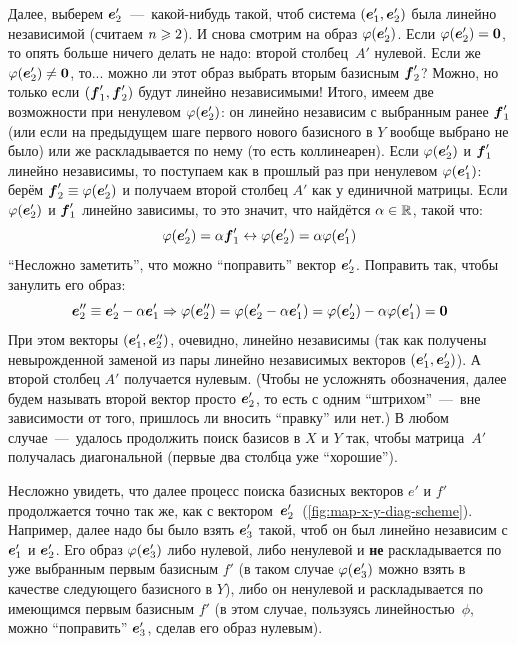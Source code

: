 \documentclass[a4paper,12pt]{article}
\begin{document}
  Далее, выберем $\boldsymbol e_2'$~---~какой-нибудь такой, чтоб система $(\boldsymbol e_1', \boldsymbol e_2')$ была линейно независимой (считаем $n \hm\geq 2$).
  И снова смотрим на образ $\varphi(\boldsymbol e_2')$.
  Если $\phi(\bds e_2') \hm= \bds 0$, то опять больше ничего делать не надо: второй столбец~$A'$ нулевой.
  Если же $\phi(\bds e_2') \hm{\not=} \bds 0$, то... можно ли этот образ выбрать вторым базисным $\boldsymbol f_2'$?
  Можно, но только если $(\boldsymbol f_1', \boldsymbol f_2')$ будут линейно независимыми!
  Итого, имеем две возможности при ненулевом $\varphi(\boldsymbol e_2')$: он линейно независим с выбранным ранее $\boldsymbol f_1'$ (или если на предыдущем шаге первого нового базисного в $Y$ вообще выбрано не было) или же раскладывается по нему (то есть коллинеарен).
  Если $\varphi(\boldsymbol e_2')$ и $\boldsymbol f_1'$ линейно независимы, то поступаем как в прошлый раз при ненулевом $\varphi(\boldsymbol e_1')$: берём $\bds f_2' \hm\equiv \phi(\bds e_2')$ и получаем второй столбец $A'$ как у единичной матрицы.
  Если $\varphi(\boldsymbol e_2')$ и $\boldsymbol f_1'$ линейно зависимы, то это значит, что найдётся $\alpha \hm\in \RR$, такой что:
  \[
    \varphi(\boldsymbol e_2') = \alpha \boldsymbol f_1' \leftrightarrow \varphi(\boldsymbol e_2') = \alpha \varphi(\boldsymbol e_1')
  \]
  ``Несложно заметить'', что можно ``поправить'' вектор $\boldsymbol e_2'$.
  Поправить так, чтобы занулить его образ:
  \[
    \boldsymbol e_2'' \equiv \boldsymbol e_2' - \alpha \boldsymbol e_1'
    \Rightarrow \varphi(\boldsymbol e_2'') = \varphi(\boldsymbol e_2' - \alpha \boldsymbol e_1') = \varphi(\boldsymbol e_2') - \alpha \varphi(\boldsymbol e_1') = \boldsymbol 0
  \]
  При этом векторы $(\boldsymbol e_1', \boldsymbol e_2'')$, очевидно, линейно независимы (так как получены невырожденной заменой из пары линейно независимых векторов $(\boldsymbol e_1', \boldsymbol e_2')$).
  А второй столбец $A'$ получается нулевым.
  (Чтобы не усложнять обозначения, далее будем называть второй вектор просто $\boldsymbol e_2'$, то есть с одним ``штрихом''~---~вне зависимости от того, пришлось ли вносить ``правку'' или нет.)
  В любом случае~---~удалось продолжить поиск базисов в $X$ и $Y$ так, чтобы матрица~$A'$ получалась диагональной (первые два столбца уже ``хорошие'').
  
  Несложно увидеть, что далее процесс поиска базисных векторов $e'$ и $f'$ продолжается точно так же, как с вектором~$\boldsymbol e_2'$~(\ref{fig:map-x-y-diag-scheme}).
  Например, далее надо бы было взять $\boldsymbol e_3'$ такой, чтоб он был линейно независим с $\boldsymbol e_1'$ и $\boldsymbol e_2'$.
  Его образ $\varphi(\boldsymbol e_3')$ либо нулевой, либо ненулевой и \textbf{не} раскладывается по уже выбранным первым базисным $f'$ (в таком случае $\varphi(\boldsymbol e_3')$ можно взять в качестве следующего базисного в $Y$), либо он ненулевой и раскладывается по имеющимся первым базисным $f'$ (в этом случае, пользуясь линейностью~$\phi$, можно ``поправить'' $\boldsymbol e_3'$, сделав его образ нулевым).
  
\end{document}
